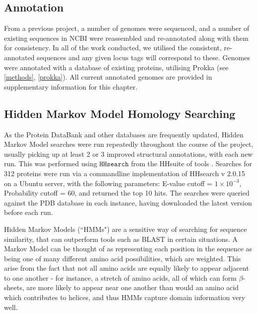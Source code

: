 	\subsection{Annotation}\label{annotation}
	From a previous project, a number of \Pa{} genomes were sequenced, and a number of existing sequences in NCBI were reassembled and re-annotated along with them for consistency. In all of the work conducted, we utilised the consistent, re-annotated sequences and any given locus tags will correspond to these. Genomes were annotated with a database of existing \Pa{} proteins, utilising Prokka \citep{Seemann2014} (see \vref{methods},  \vref{prokka}). All current annotated genomes are provided in supplementary information for this chapter. 
	
	\subsection{Hidden Markov Model Homology Searching}\label{hhresults}
	As the Protein DataBank and other databases are frequently updated, Hidden Markov Model searches were run repeatedly throughout the course of the project, usually picking up at least 2 or 3 improved structural annotations, with each new run. This was performed using $\mathtt{HHsearch}$ from the HHsuite of tools \citep{Remmert2012}. Searches for 312 proteins were run via a commandline implementation of HHsearch v 2.0.15 on a Ubuntu server, with the following parameters: E-value cutoff = $1\times10^{-3}$, Probability cutoff = 60, and returned the top 10 hits. The searches were queried against the PDB database in each instance, having downloaded the latest version before each run.
	
Hidden Markov Models (``HMMs") are a sensitive way of searching for sequence similarity, that can outperform tools such as BLAST in certain situations. A Markov Model can be thought of as representing each position in the sequence as being one of many different amino acid possibilities, which are weighted. This arise from the fact that not all amino acids are equally likely to appear adjacent to one another - for instance, a stretch of amino acids, all of which can form $\beta$-sheets, are more likely to appear near one another than would an amino acid which contributes to helices, and thus HMMs capture domain information very well.
	

